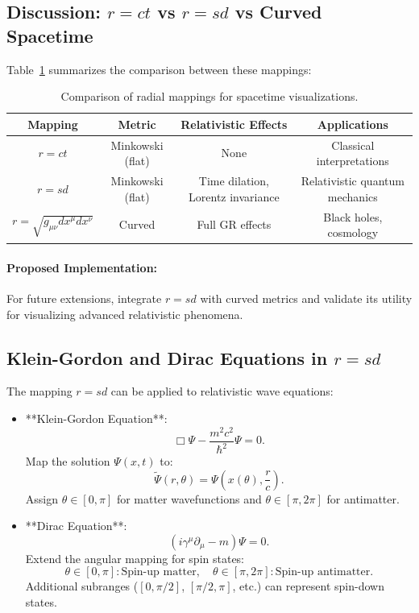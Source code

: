 \documentclass[12pt]{article}
\begin{document}
\subsection{Discussion: \(r = ct\) vs \(r = sd\) vs Curved Spacetime}
Table~\ref{tab:metric_comparison} summarizes the comparison between these mappings:

\begin{table}[h!]
    \centering
    \begin{tabular}{|c|c|c|c|}
        \hline
        Mapping & Metric & Relativistic Effects & Applications \\
        \hline
        \(r = ct\) & Minkowski (flat) & None & Classical interpretations \\
        \(r = sd\) & Minkowski (flat) & Time dilation, Lorentz invariance & Relativistic quantum mechanics \\
        \(r = \sqrt{g_{\mu\nu} dx^\mu dx^\nu}\) & Curved & Full GR effects & Black holes, cosmology \\
        \hline
    \end{tabular}
    \caption{Comparison of radial mappings for spacetime visualizations.}
    \label{tab:metric_comparison}
\end{table}

\paragraph{Proposed Implementation:}
For future extensions, integrate \(r = sd\) with curved metrics and validate its utility for visualizing advanced relativistic phenomena.

\subsection{Klein-Gordon and Dirac Equations in \(r = sd\)}
The mapping \(r = sd\) can be applied to relativistic wave equations:
\begin{itemize}
    \item **Klein-Gordon Equation**:
    \[
    \Box \Psi - \frac{m^2 c^2}{\hbar^2} \Psi = 0.
    \]
    Map the solution \(\Psi(x, t)\) to:
    \[
    \tilde{\Psi}(r, \theta) = \Psi\left(x(\theta), \frac{r}{c}\right).
    \]
    Assign \(\theta \in [0, \pi]\) for matter wavefunctions and \(\theta \in [\pi, 2\pi]\) for antimatter.

    \item **Dirac Equation**:
    \[
    (i\gamma^\mu \partial_\mu - m)\Psi = 0.
    \]
    Extend the angular mapping for spin states:
    \[
    \theta \in [0, \pi]: \text{Spin-up matter}, \quad \theta \in [\pi, 2\pi]: \text{Spin-up antimatter}.
    \]
    Additional subranges (\([0, \pi/2]\), \([\pi/2, \pi]\), etc.) can represent spin-down states.
\end{itemize}
\end{document}
